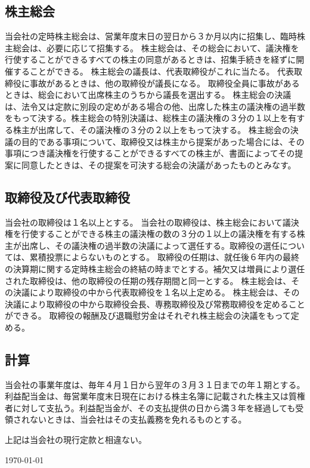 \documentclass[10pt,a4paper,uplatex]{jsarticle}
\begin{document}
\subsection{株主総会}
当会社の定時株主総会は、営業年度末日の翌日から３か月以内に招集し、臨時株主総会は、必要に応じて招集する。
株主総会は、その総会において、議決権を行使することができるすべての株主の同意があるときは、招集手続きを経ずに開催することができる。
株主総会の議長は、代表取締役がこれに当たる。
\term 代表取締役に事故があるときは、他の取締役が議長になる。
\term 取締役全員に事故があるときは、総会において出席株主のうちから議長を選出する。
株主総会の決議は、法令又は定款に別段の定めがある場合の他、出席した株主の議決権の過半数をもって決する。株主総会の特別決議は、総株主の議決権の３分の１以上を有する株主が出席して、その議決権の３分の２以上をもって決する。
株主総会の決議の目的である事項について、取締役又は株主から提案があった場合には、その事項につき議決権を行使することができるすべての株主が、書面によってその提案に同意したときは、その提案を可決する総会の決議があったものとみなす。

\subsection{取締役及び代表取締役}
当会社の取締役は１名以上とする。
当会社の取締役は、株主総会において議決権を行使することができる株主の議決権の数の３分の１以上の議決権を有する株主が出席し、その議決権の過半数の決議によって選任する。取締役の選任については、累積投票によらないものとする。
取締役の任期は、就任後６年内の最終の決算期に関する定時株主総会の終結の時までとする。補欠又は増員により選任された取締役は、他の取締役の任期の残存期間と同一とする。
株主総会は、その決議により取締役の中から代表取締役を１名以上定める。
\term 株主総会は、その決議により取締役の中から取締役会長、専務取締役及び常務取締役を定めることができる。
取締役の報酬及び退職慰労金はそれぞれ株主総会の決議をもって定める。


\subsection{計算}
当会社の事業年度は、毎年４月１日から翌年の３月３１日までの年１期とする。
利益配当金は、毎営業年度末日現在における株主名簿に記載された株主又は質権者に対して支払う。利益配当金が、その支払提供の日から満３年を経過しても受領されないときは、当会社はその支払義務を免れるものとする。


\vspace{20pt}
上記は当会社の現行定款と相違ない。
\begin{flushleft} 
\today\\
\vspace{10pt}
\MakeSignatureField
\end{flushleft}
\end{document}
